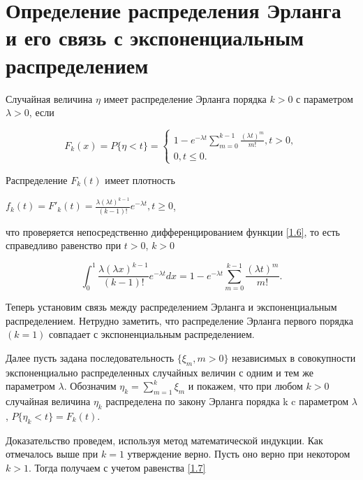 \section{Определение распределения Эрланга и его связь с экспоненциальным распределением}

Случайная величина $\eta$ имеет распределение Эрланга порядка $k>0$ с параметром $\lambda>0$, если

\begin{center}
	
	\begin{equation}
	\label {1.6}
	F_k(x) = P \{\eta<t\} = \begin{cases}1-e^{-\lambda t} \sum_{m=0}^{k-1}\frac{(\lambda t)^m}{m!},t>0,\\0,t\leq0.\end{cases}
	\end{equation} 
\end{center}


Распределение $F_k(t)$ имеет плотность


\begin{center}
	$ f_k(t)= F'_k(t) = \frac{\lambda(\lambda t)^{k-1}}{(k-1)!}e^{-\lambda t},t\geq0$,
\end{center}


что проверяется непосредственно дифференцированием функции \ref{1.6}, то есть справедливо равенство при $t>0$, $k>0$

\begin{center}
	\begin{equation}
	\label{1.7}
	\int_{0}^{1}\frac{\lambda(\lambda x)^{k-1}}{(k-1)!}e^{-\lambda t}dx = 1-e^{-\lambda t} \sum_{m=0}^{k-1}\frac{(\lambda t)^m}{m!}.
	\end{equation}
\end{center} 


Теперь установим связь между распределением Эрланга и экспоненциальным распределением. Нетрудно заметить, что распределение Эрланга первого порядка $(k=1)$ совпадает с экспоненциальным распределением.


Далее пусть задана последовательность $\{\xi_m, m>0\}$ независимых  в совокупности экспоненциально распределенных случайных величин с одним и тем же параметром $\lambda$. Обозначим $\eta_k = \sum_{m=1}^{k}\xi_m$ и покажем, что при любом $k>0$ случайная величина $\eta_k$ распределена по закону Эрланга порядка k c параметром $\lambda$, $P\{\eta_k<t\} = F_k(t)$.

Доказательство проведем, используя метод математической индукции. Как отмечалось выше при $k=1$ утверждение верно. Пусть оно верно при некотором $k>1$. Тогда получаем с учетом равенства \ref{1.7}

